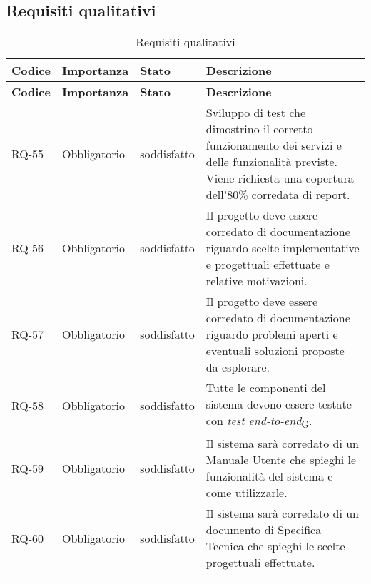 \subsection{Requisiti qualitativi}
\begin{longtable}{|>{\centering\arraybackslash}m{}|>{\centering\arraybackslash}m{}|>{\centering\arraybackslash}m{}|>{\centering\arraybackslash}m{}|}
	\hline
	\textbf{Codice} & \textbf{Importanza} & \textbf{Stato}& \textbf{Descrizione}\\\hline
	\endfirsthead
	\hline
	\textbf{Codice} & \textbf{Importanza} & \textbf{Stato}& \textbf{Descrizione}\\\hline
	\endhead
	\hline
	RQ-55           & Obbligatorio        & soddisfatto & Sviluppo di test che dimostrino il corretto funzionamento dei servizi e delle funzionalità previste. Viene richiesta una copertura dell'80\% corredata di report.
	\\\hline
	RQ-56           & Obbligatorio        & soddisfatto & Il progetto deve essere corredato di documentazione riguardo scelte implementative e progettuali effettuate e relative motivazioni.
	\\\hline
	RQ-57           & Obbligatorio        & soddisfatto & Il progetto deve essere corredato di documentazione riguardo problemi aperti e eventuali soluzioni proposte da esplorare.
	\\\hline
	RQ-58           & Obbligatorio        & soddisfatto & Tutte le componenti del sistema devono essere testate con \href{https://7last.github.io/docs/pb/documentazione-interna/glossario\#test-end-to-end}{\textit{test end-to-end}\textsubscript{G}}.
	\\\hline
	RQ-59           & Obbligatorio        & soddisfatto                                                                                                                                                                                                                                              & Il sistema sarà corredato di un Manuale Utente che spieghi le funzionalità del sistema e come utilizzarle.
	\\\hline
	RQ-60           & Obbligatorio        & soddisfatto                                                                                                                                                                                                                                              & Il sistema sarà corredato di un documento di Specifica Tecnica che spieghi le scelte progettuali effettuate.
	\\\hline
	\caption{Requisiti qualitativi}
\end{longtable}

